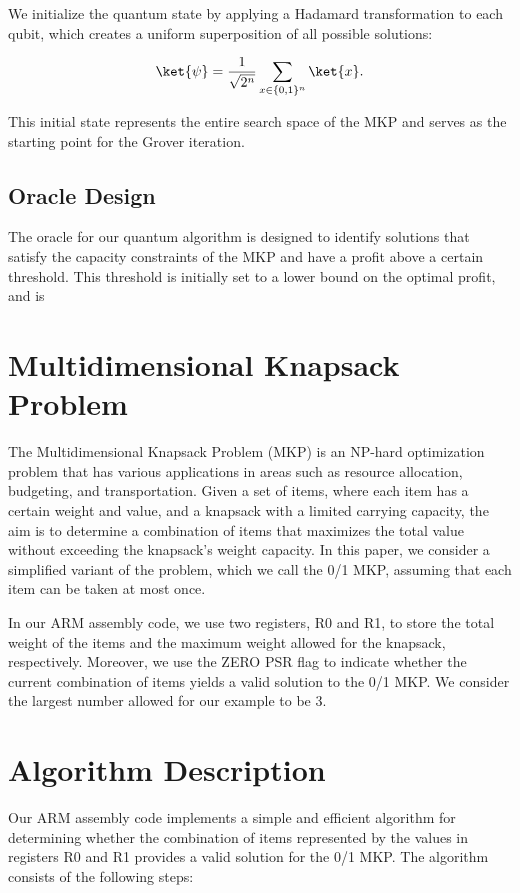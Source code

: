 We initialize the quantum state by applying a Hadamard transformation to each qubit, which creates a uniform superposition of all possible solutions:

\begin{equation}
    \ket{\psi} = \frac{1}{\sqrt{2^n}} \sum_{x \in \{0, 1\}^n} \ket{x}.
\end{equation}

This initial state represents the entire search space of the MKP and serves as the starting point for the Grover iteration.

\subsection{Oracle Design}
\label{subsec:oracle}
The oracle for our quantum algorithm is designed to identify solutions that satisfy the capacity constraints of the MKP and have a profit above a certain threshold. This threshold is initially set to a lower bound on the optimal profit, and is

\section{Multidimensional Knapsack Problem}
The Multidimensional Knapsack Problem (MKP) is an NP-hard optimization problem that has various applications in areas such as resource allocation, budgeting, and transportation. Given a set of items, where each item has a certain weight and value, and a knapsack with a limited carrying capacity, the aim is to determine a combination of items that maximizes the total value without exceeding the knapsack's weight capacity. In this paper, we consider a simplified variant of the problem, which we call the 0/1 MKP, assuming that each item can be taken at most once.

In our ARM assembly code, we use two registers, R0 and R1, to store the total weight of the items and the maximum weight allowed for the knapsack, respectively. Moreover, we use the ZERO PSR flag to indicate whether the current combination of items yields a valid solution to the 0/1 MKP. We consider the largest number allowed for our example to be 3.

\section{Algorithm Description}
Our ARM assembly code implements a simple and efficient algorithm for determining whether the combination of items represented by the values in registers R0 and R1 provides a valid solution for the 0/1 MKP. The algorithm consists of the following steps:

